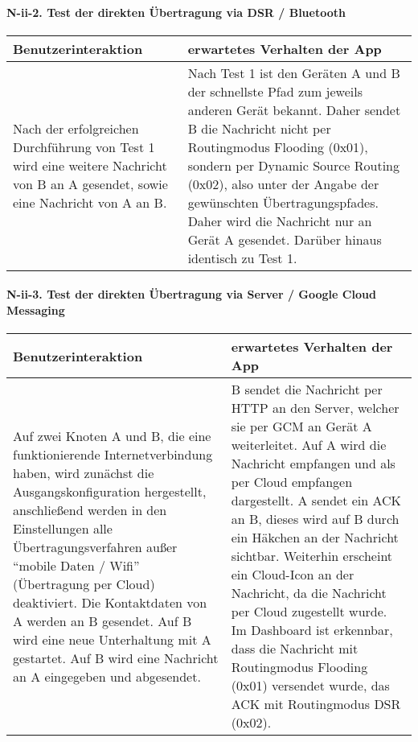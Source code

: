\paragraph{N-ii-2. Test der direkten Übertragung via DSR /
Bluetooth}\label{test-der-direkten-uxfcbertragung-via-dsr-bluetooth}

\begin{longtable}{p{8cm}p{8.5cm}}
\toprule
Benutzerinteraktion & erwartetes Verhalten der App\tabularnewline
\midrule
\endhead
Nach der erfolgreichen Durchführung von Test 1 wird eine weitere
Nachricht von B an A gesendet, sowie eine Nachricht von A an B. & Nach
Test 1 ist den Geräten A und B der schnellste Pfad zum jeweils anderen
Gerät bekannt. Daher sendet B die Nachricht nicht per Routingmodus
Flooding (0x01), sondern per Dynamic Source Routing (0x02), also unter
der Angabe der gewünschten Übertragungspfades. Daher wird die Nachricht
nur an Gerät A gesendet. Darüber hinaus identisch zu Test
1.\tabularnewline
\bottomrule
\end{longtable}

\paragraph{N-ii-3. Test der direkten Übertragung via Server / Google Cloud
Messaging}\label{test-der-direkten-uxfcbertragung-via-server-google-cloud-messaging}

\begin{longtable}{p{8cm}p{8.5cm}}
\toprule
Benutzerinteraktion & erwartetes Verhalten der App\tabularnewline
\midrule
\endhead
Auf zwei Knoten A und B, die eine funktionierende Internetverbindung
haben, wird zunächst die Ausgangskonfiguration hergestellt, anschließend
werden in den Einstellungen alle Übertragungsverfahren außer ``mobile
Daten / Wifi'' (Übertragung per Cloud) deaktiviert. Die Kontaktdaten von
A werden an B gesendet. Auf B wird eine neue Unterhaltung mit A
gestartet. Auf B wird eine Nachricht an A eingegeben und abgesendet. & B
sendet die Nachricht per HTTP an den Server, welcher sie per GCM an
Gerät A weiterleitet. Auf A wird die Nachricht empfangen und als per
Cloud empfangen dargestellt. A sendet ein ACK an B, dieses wird auf B
durch ein Häkchen an der Nachricht sichtbar. Weiterhin erscheint ein
Cloud-Icon an der Nachricht, da die Nachricht per Cloud zugestellt
wurde. Im Dashboard ist erkennbar, dass die Nachricht mit Routingmodus
Flooding (0x01) versendet wurde, das ACK mit Routingmodus DSR
(0x02).\tabularnewline
\bottomrule
\end{longtable}


